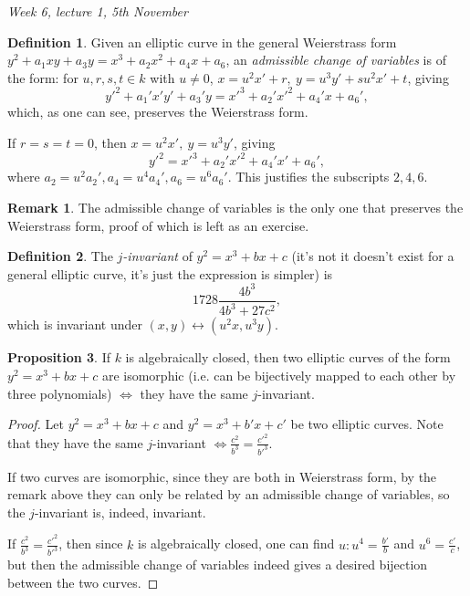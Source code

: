 \documentclass{article}
\theoremstyle{definition}
\newtheorem{defn}{Definition}[subsection]
\newtheorem{prop}[defn]{Proposition}
\newtheorem*{remark}{Remark}
\begin{document}
\begin{flushright}
\textit{Week 6, lecture 1, 5th November}
\end{flushright}

\begin{defn}
Given an elliptic curve in the general Weierstrass form $y^2+a_1xy+a_3y=x^3+a_2x^2+a_4x+a_6$, an \textit{admissible change of variables} is of the form: for $u,r,s,t\in k$ with $u\neq 0$, $x=u^2x'+r,\ y=u^3y'+su^2x'+t$, giving
\[
y'^2+a_1'x'y'+a_3'y=x'^3+a_2'x'^2+a_4'x+a_6',
\]
which, as one can see, preserves the Weierstrass form.

If $r=s=t=0$, then $x=u^2x',\ y=u^3y'$, giving
\[
y'^2=x'^3+a_2'x'^2+a_4'x'+a_6',
\]
where $a_2=u^2a_2',a_4=u^4a_4',a_6=u^6a_6'$. This justifies the subscripts $2,4,6$.
\end{defn}

\begin{remark}
The admissible change of variables is the only one that preserves the Weierstrass form, proof of which is left as an exercise.
\end{remark}

\begin{defn}
The $j$\textit{-invariant} of $y^2=x^3+bx+c$ (it's not it doesn't exist for a general elliptic curve, it's just the expression is simpler) is
\[
1728\frac{4b^3}{4b^3+27c^2},
\]
which is invariant under $(x,y)\leftrightarrow(u^2x,u^3y)$.
\end{defn}

\begin{prop}
If $k$ is algebraically closed, then two elliptic curves of the form $y^2=x^3+bx+c$ are isomorphic (i.e. can be bijectively mapped to each other by three polynomials) $\iff$ they have the same $j$-invariant.
\end{prop}
\begin{proof}
Let $y^2=x^3+bx+c$ and $y^2=x^3+b'x+c'$ be two elliptic curves. Note that they have the same $j$-invariant $\iff \frac{c^2}{b^3}=\frac{c'^2}{b'^3}$.

If two curves are isomorphic, since they are both in Weierstrass form, by the remark above they can only be related by an admissible change of variables, so the $j$-invariant is, indeed, invariant.

If $\frac{c^2}{b^3}=\frac{c'^2}{b'^3}$, then since $k$ is algebraically closed, one can find $u:u^4=\frac{b'}{b}$ and $u^6=\frac{c'}{c}$, but then the admissible change of variables indeed gives a desired bijection between the two curves.
\end{proof}
\end{document}
